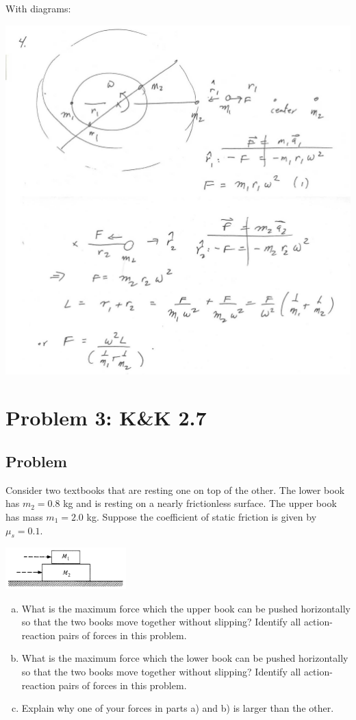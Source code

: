 \documentclass[solutions]{esg8012pset}
\begin{document}
  \noindent With diagrams:
  \begin{center}\includegraphics[width=\textwidth]{ps02_Solution_Problem_2}\end{center}
\section*{Problem 3: K\&K 2.7}
\subsection*{Problem}
  Consider two textbooks that are resting one on top of the other. The lower book has $m_2 = 0.8$ kg and is resting on a nearly frictionless surface. The upper book has mass $m_1 = 2.0$ kg. Suppose the coefficient of static friction is given by $\mu_s = 0.1$.
  \begin{center}\includegraphics[width=0.35\textwidth]{ps02_2}\end{center}
  \begin{enumerate}[a)]
    \item What is the maximum force which the upper book can be pushed horizontally so that the two books move together without slipping? Identify all action-reaction pairs of forces in this problem.
    \item What is the maximum force which the lower book can be pushed horizontally so that the two books move together without slipping? Identify all action-reaction pairs of forces in this problem.
    \item Explain why one of your forces in parts a) and b) is larger than the other.
  \end{enumerate}
\end{document}
